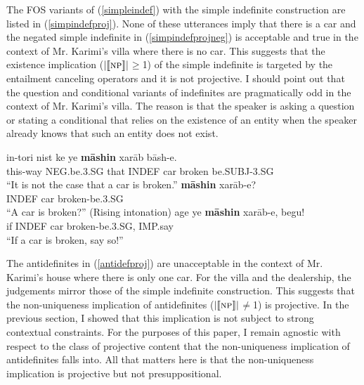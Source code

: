 \documentclass{salt}
\begin{document}
The FOS variants of (\ref{simpleindef}) with the simple indefinite construction are listed in (\ref{simpindefproj}). None of these utterances imply that there is a car and the negated simple indefinite in (\ref{simpindefprojneg}) is acceptable and true in the context of Mr. Karimi's villa where there is no car. This suggests that the existence implication ($| \llbracket \textsc{np} \rrbracket |$$\geq$1) of the simple indefinite is targeted by the entailment canceling operators and it is not projective. I should point out that the question and conditional variants of indefinites are pragmatically odd in the context of Mr. Karimi's villa. The reason is that the speaker is asking a question or stating a conditional that relies on the existence of an entity when the speaker already knows that such an entity does not exist.

	\begin {exe}
	\ex \label {simpindefproj}\begin {xlist}
	\ex \label {simpindefprojneg}
		\gll	in-tori	nist		ke 	{\color {red}ye}	\textbf{m\={a}shin}	xar\={a}b b\={a}sh-e.\\
			this-way	{\scriptsize NEG}.be{\scriptsize .3.SG}	that {\scriptsize INDEF} car 	broken be{\scriptsize .SUBJ-3.SG}\\			
			``It is not the case that a car is broken.''
	\ex \label {simpindefprojqu}	
			\textbf{m\={a}shin}	xar\={a}b-e?\\
			{\scriptsize INDEF} car 	broken-be{\scriptsize .3.SG}\\
			``A car is broken?'' (Rising intonation)
	\ex	\label {simpindefprojcon}
		\gll	age {\color {red}ye}	\textbf{m\={a}shin}	xar\={a}b-e, begu!\\
			if 	{\scriptsize INDEF}	car	broken-be{\scriptsize .3.SG}, {\scriptsize IMP}.say\\
			``If a car is broken, say so!''
	\end {xlist}
	\end {exe}

The antidefinites in (\ref{antidefproj}) are unacceptable in the context of Mr. Karimi's house where there is only one car. For the villa and the dealership, the judgements mirror those of the simple indefinite construction. This suggests that the non-uniqueness implication of antidefinites ($| \llbracket \textsc{np} \rrbracket |$$\not =$1) is projective. In the previous section, I showed that this implication is not subject to strong contextual constraints. For the purposes of this paper, I remain agnostic with respect to the class of projective content that the non-uniqueness implication of antidefinites falls into. All that matters here is that the non-uniqueness implication is projective but not presuppositional.
\end{document}
